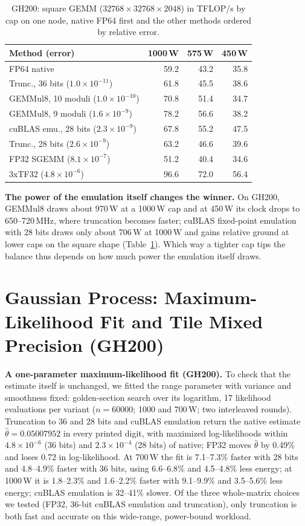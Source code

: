 \documentclass[conference]{IEEEtran}
\newcommand{\W}{\,W}
\newcommand{\ee}[2]{#1{\times}10^{#2}}  %
\newcommand{\pct}{\%}
\begin{document}
\begin{table}[t]
\caption{GH200: square GEMM ($32768{\times}32768{\times}2048$) in TFLOP/s by cap on one node, native FP64 first and the
other methods ordered by relative error.}\label{tab:methods}
\centering\footnotesize\setlength{\tabcolsep}{4pt}
\begin{tabular}{@{}lrrr@{}}
\toprule
Method (error) & 1000\W & 575\W & 450\W \\
\midrule
FP64 native & 59.2 & 43.2 & 35.8 \\
Trunc., 36 bits ($\ee{1.0}{-11}$) & 61.8 & 45.5 & 38.6 \\
GEMMul8, 10 moduli ($\ee{1.0}{-10}$) & 70.8 & 51.4 & 34.7 \\
GEMMul8, 9 moduli ($\ee{1.6}{-9}$) & 78.2 & 56.6 & 38.2 \\
cuBLAS emu., 28 bits ($\ee{2.3}{-9}$) & 67.8 & 55.2 & 47.5 \\
Trunc., 28 bits ($\ee{2.6}{-9}$) & 63.2 & 46.6 & 39.6 \\
FP32 SGEMM ($\ee{8.1}{-7}$) & 51.2 & 40.4 & 34.6 \\
3xTF32 ($\ee{4.8}{-6}$) & 96.6 & 72.0 & 56.4 \\
\bottomrule
\end{tabular}
\end{table}

\textbf{The power of the emulation itself changes the winner.} On GH200, GEMMul8 draws about 970\W{} at a 1000\W{} cap and at
450\W{} its clock drops to 650--720\,MHz, where truncation becomes faster; cuBLAS fixed-point emulation with 28 bits draws only
about 706\W{} at 1000\W{} and gains relative ground at lower caps on the square shape (Table~\ref{tab:methods}).
Which way a tighter cap tips the balance thus depends on how much power the emulation itself draws.

\section{Gaussian Process: Maximum-Likelihood Fit and Tile Mixed Precision (GH200)}\label{sec:gpextra}
\textbf{A one-parameter maximum-likelihood fit (GH200).} To check that the estimate itself is unchanged, we fitted the range
parameter with variance and smoothness fixed: golden-section search over its logarithm, 17 likelihood evaluations
per variant ($n=60000$; 1000 and 700\W; two interleaved rounds). Truncation to 36 and 28 bits and cuBLAS emulation
return the native estimate
$\hat\theta=0.05007952$ in every printed digit, with maximized log-likelihoods within $\ee{4.8}{-6}$ (36 bits) and
$\ee{2.3}{-4}$ (28 bits) of native; FP32 moves $\hat\theta$ by 0.49\pct{} and loses 0.72 in log-likelihood. At
700\W{} the fit is 7.1--7.3\pct{} faster with 28 bits
and 4.8--4.9\pct{} faster with 36 bits, using 6.6--6.8\pct{} and 4.5--4.8\pct{} less energy; at 1000\W{} it is
1.8--2.3\pct{} and 1.6--2.2\pct{} faster with 9.1--9.9\pct{} and 3.5--5.6\pct{} less energy; cuBLAS emulation is
32--41\pct{} slower. Of the three whole-matrix choices we tested (FP32, 36-bit cuBLAS emulation and truncation), only
truncation is both fast and accurate on this wide-range, power-bound workload.
\end{document}
